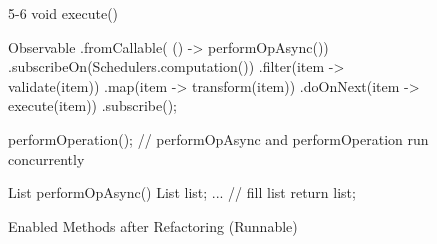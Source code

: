 \begin{figure}[H]
\begin{sourcecode}
\begin{javacode}{5-6}
void execute() {
	Observable
        	.fromCallable( () -> performOpAsync())
        	.subscribeOn(Schedulers.computation())
        	.filter(item -> validate(item))
        	.map(item -> transform(item))
        	.doOnNext(item -> execute(item))
        	.subscribe();

	performOperation();
	// performOpAsync and performOperation run concurrently
}

List performOpAsync() {
	List list;
	... // fill list
	return list;
}
\end{javacode}
\caption{Enabled Methods after Refactoring (Runnable)}
\label{code:con-enabled-methods-runnable}
\end{sourcecode}
\end{figure}